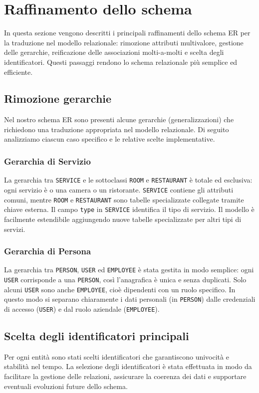 \documentclass[a4paper,12pt]{report}
\begin{document}
\newpage
\section{Raffinamento dello schema}
In questa sezione vengono descritti i principali raffinamenti dello
schema ER per la traduzione nel modello relazionale: rimozione
attributi multivalore, gestione delle gerarchie, reificazione delle
associazioni molti-a-molti e scelta degli identificatori. Questi
passaggi rendono lo schema relazionale più semplice ed efficiente.

\subsection{Rimozione gerarchie}
Nel nostro schema ER sono presenti alcune gerarchie
(generalizzazioni) che richiedono una traduzione appropriata nel
modello relazionale. Di seguito analizziamo ciascun caso specifico e
le relative scelte implementative.

\subsubsection{Gerarchia di Servizio}
La gerarchia tra \texttt{SERVICE} e le sottoclassi \texttt{ROOM} e
\texttt{RESTAURANT} è totale
ed esclusiva: ogni servizio è o una camera o un ristorante. \texttt{SERVICE}
contiene gli attributi comuni, mentre \texttt{ROOM} e
\texttt{RESTAURANT} sono tabelle
specializzate collegate tramite chiave esterna. Il campo
\texttt{type} in \texttt{SERVICE} identifica il tipo di servizio. Il modello è
facilmente estendibile aggiungendo nuove tabelle specializzate per
altri tipi di servizi.

\subsubsection{Gerarchia di Persona}
La gerarchia tra \texttt{PERSON}, \texttt{USER} ed \texttt{EMPLOYEE}
è stata gestita in modo semplice: ogni \texttt{USER} corrisponde a
una \texttt{PERSON}, così l'anagrafica è unica e senza duplicati.
Solo alcuni \texttt{USER} sono anche \texttt{EMPLOYEE}, cioè
dipendenti con un ruolo specifico. In questo modo si separano
chiaramente i dati personali (in \texttt{PERSON}) dalle credenziali
di accesso (\texttt{USER}) e dal ruolo aziendale (\texttt{EMPLOYEE}).

\subsection{Scelta degli identificatori principali}
Per ogni entità sono stati scelti identificatori che garantiscono
univocità e stabilità nel tempo. La selezione degli identificatori è
stata effettuata in modo da facilitare la gestione delle relazioni,
assicurare la coerenza dei dati e supportare eventuali evoluzioni
future dello schema.
\end{document}
